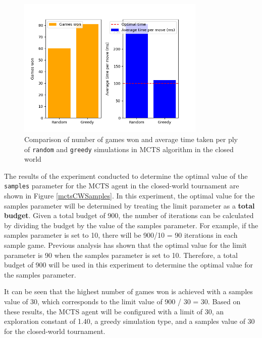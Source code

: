 \begin{figure}[h!]
  \centering
  \captionsetup{justification=centering}
  \includegraphics[width=0.8\textwidth]{../img/mcts_simulation_closedworld.png}
  \caption{Comparison of number of games won and average time taken per ply of \texttt{random} and \texttt{greedy} simulations in MCTS algorithm in the closed world}
  \label{mctsCWSimulations}
\end{figure}

The results of the experiment conducted to determine the optimal value of the \texttt{samples} parameter for the MCTS agent in the closed-world tournament are shown in Figure \ref{mctsCWSamples}. In this experiment, the optimal value for the samples parameter will be determined by treating the limit parameter as a \textbf{total budget}. Given a total budget of 900, the number of iterations can be calculated by dividing the budget by the value of the samples parameter. For example, if the samples parameter is set to 10, there will be 900/10 = 90 iterations in each sample game. Previous analysis has shown that the optimal value for the limit parameter is 90 when the samples parameter is set to 10. Therefore, a total budget of 900 will be used in this experiment to determine the optimal value for the samples parameter.

It can be seen that the highest number of games won is achieved with a samples value of 30, which corresponds to the limit value of 900 / 30 = 30. Based on these results, the MCTS agent will be configured with a limit of 30, an exploration constant of 1.40, a greedy simulation type, and a samples value of 30 for the closed-world tournament.

